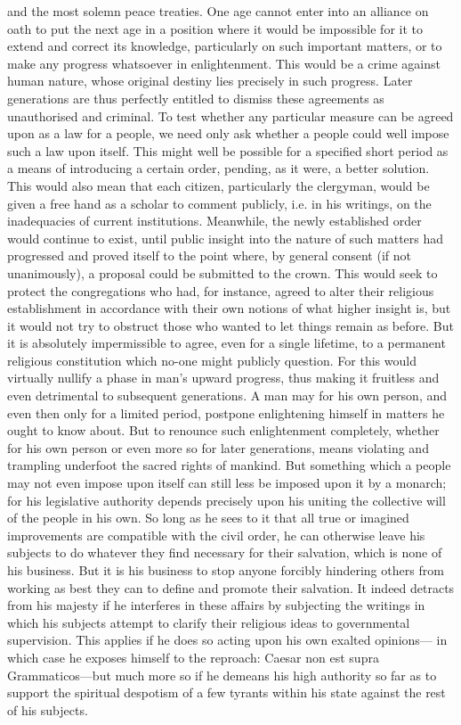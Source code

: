 \documentclass[11pt,twocolumn]{ltugboat}
\begin{document}
and the most solemn peace treaties. One age cannot enter into an alliance on oath to put the next age in a position where it would be impossible for it to extend and correct its knowledge, particularly on such important matters, or to make any progress whatsoever in enlightenment. This would be a crime against human nature, whose original destiny lies precisely in such progress. Later generations are thus perfectly entitled to dismiss these agreements as unauthorised and criminal. To test whether any particular measure can be agreed upon as a law for a people, we need only ask whether a people could well impose such a law upon itself. This might well be possible for a specified short period as a means of introducing a certain order, pending, as it were, a better solution. This would also mean that each citizen, particularly the clergyman, would be given a free hand as a scholar to comment publicly, i.e. in his writings, on the inadequacies of current institutions. Meanwhile, the newly established order would continue to exist, until public insight into the nature of such matters had progressed and proved itself to the point where, by general consent (if not unanimously), a proposal could be submitted to the crown. This would seek to protect the congregations who had, for instance, agreed to alter their religious establishment in accordance with their own notions of what higher insight is, but it would not try to obstruct those who wanted to let things remain as before. But it is absolutely impermissible to agree, even for a single lifetime, to a permanent religious constitution which no-one might publicly question. For this would virtually nullify a phase in man's upward progress, thus making it fruitless and even detrimental to subsequent generations. A man may for his own person, and even then only for a limited period, postpone enlightening himself in matters he ought to know about. But to renounce such enlightenment completely, whether for his own person or even more so for later generations, means violating and trampling underfoot the sacred rights of mankind. But something which a people may not even impose upon itself can still less be imposed upon it by a monarch; for his legislative authority depends precisely upon his uniting the collective will of the people in his own. So long as he sees to it that all true or imagined improvements are compatible with the civil order, he can otherwise leave his subjects to do whatever they find necessary for their salvation, which is none of his business. But it is his business to stop anyone forcibly hindering others from working as best they can to define and promote their salvation. It indeed detracts from his majesty if he interferes in these affairs by subjecting the writings in which his subjects attempt to clarify their religious ideas to governmental supervision. This applies if he does so acting upon his own exalted opinions— in which case he exposes himself to the reproach: Caesar non est supra Grammaticos—but much more so if he demeans his high authority so far as to support the spiritual despotism of a few tyrants within his state against the rest of his subjects.
\end{document}

